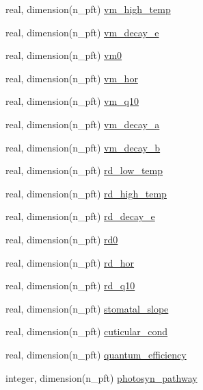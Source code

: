 \begin{DoxyCompactItemize}
\item 
real, dimension(n\+\_\+pft) \hyperlink{namespacepft__coms_a847c455daab9b125944dd2057d418b6c}{vm\+\_\+high\+\_\+temp}
\item 
real, dimension(n\+\_\+pft) \hyperlink{namespacepft__coms_a05c121e99b033c3fa874fc7ffd66fad3}{vm\+\_\+decay\+\_\+e}
\item 
real, dimension(n\+\_\+pft) \hyperlink{namespacepft__coms_a80a6462c48a36d9c1ab7bcf0b6296702}{vm0}
\item 
real, dimension(n\+\_\+pft) \hyperlink{namespacepft__coms_a1424943ac59ffe1e85af3d7eeca315bb}{vm\+\_\+hor}
\item 
real, dimension(n\+\_\+pft) \hyperlink{namespacepft__coms_a47018d91ecb1fe0c547ec131348e5fdd}{vm\+\_\+q10}
\item 
real, dimension(n\+\_\+pft) \hyperlink{namespacepft__coms_a2c9cb0165d22f8653900869b77019f4d}{vm\+\_\+decay\+\_\+a}
\item 
real, dimension(n\+\_\+pft) \hyperlink{namespacepft__coms_a21f9c00aea9610811aae2469b5070c1b}{vm\+\_\+decay\+\_\+b}
\item 
real, dimension(n\+\_\+pft) \hyperlink{namespacepft__coms_ad26dff15166122932a2a576c592451ba}{rd\+\_\+low\+\_\+temp}
\item 
real, dimension(n\+\_\+pft) \hyperlink{namespacepft__coms_a1bcf4f8ef5012e5ea47b2e5deb6dae4a}{rd\+\_\+high\+\_\+temp}
\item 
real, dimension(n\+\_\+pft) \hyperlink{namespacepft__coms_abc5e92f122fd2ebab52069105e512fa5}{rd\+\_\+decay\+\_\+e}
\item 
real, dimension(n\+\_\+pft) \hyperlink{namespacepft__coms_a52c1f01cac447b99de69af116c709b08}{rd0}
\item 
real, dimension(n\+\_\+pft) \hyperlink{namespacepft__coms_aa082b314a2092d3ee2b63f30cd1fc8be}{rd\+\_\+hor}
\item 
real, dimension(n\+\_\+pft) \hyperlink{namespacepft__coms_ac49f4aa4c8e6b1ab0c02f40ac0c443bd}{rd\+\_\+q10}
\item 
real, dimension(n\+\_\+pft) \hyperlink{namespacepft__coms_a36d072c9dc75fed2a29770bb892c0c8d}{stomatal\+\_\+slope}
\item 
real, dimension(n\+\_\+pft) \hyperlink{namespacepft__coms_a123da989ae706b508ed48db4a138ff8e}{cuticular\+\_\+cond}
\item 
real, dimension(n\+\_\+pft) \hyperlink{namespacepft__coms_ad1cdaf379a14e627f176105d6d744edb}{quantum\+\_\+efficiency}
\item 
integer, dimension(n\+\_\+pft) \hyperlink{namespacepft__coms_a697c05e70b11e609bd5316b8eed821ed}{photosyn\+\_\+pathway}

\end{DoxyCompactItemize}
